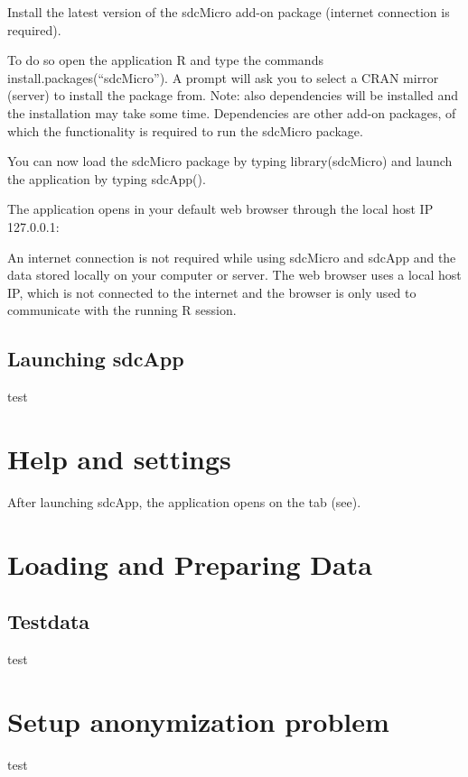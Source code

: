 \documentclass[letterpaper,10pt,english]{sphinxmanual}
\begin{document}
Install the latest version of the sdcMicro add-on package (internet connection is required).

To do so open the application R and type the commands install.packages(“sdcMicro”).
A prompt will ask you to select a CRAN mirror (server) to install the package from.
Note: also dependencies will be installed and the installation may take some time.
Dependencies are other add-on packages, of which the functionality is required to run the sdcMicro package.

You can now load the sdcMicro package by typing library(sdcMicro)
and launch the application by typing sdcApp().

The application opens in your default web browser through the local host IP 127.0.0.1:

 An internet connection is not required while using sdcMicro and sdcApp and the data
stored locally on your computer or server. The web browser uses a local host IP,
which is not connected to the internet and the browser is only used to communicate with
the running R session.


\section{Launching sdcApp}
\label{\detokenize{installation:launching-sdcapp}}
test


\chapter{Help and settings}
\label{\detokenize{about:help-and-settings}}\label{\detokenize{about::doc}}
After launching sdcApp, the application opens on the  tab (see).


\chapter{Loading and Preparing Data}
\label{\detokenize{loadprepdata::doc}}\label{\detokenize{loadprepdata:loading-and-preparing-data}}

\section{Testdata}
\label{\detokenize{loadprepdata:testdata}}
test


\chapter{Setup anonymization problem}
\label{\detokenize{setup::doc}}\label{\detokenize{setup:setup-anonymization-problem}}
test
\end{document}
